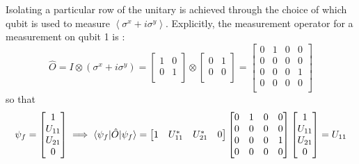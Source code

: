 \documentclass{article}
\begin{document}
    Isolating a particular row of the unitary is achieved through the choice of which qubit is used to measure $\left< \sigma^{x} + i\sigma^{y} \right>$.
    Explicitly, the measurement operator for a measurement on qubit 1 is :
    \begin{equation}
        \hat{O}=I \otimes (\sigma^{x} + i\sigma^{y}) =
        \begin{bmatrix}
            1 & 0\\
            0 & 1\\
        \end{bmatrix}
        \otimes
        \begin{bmatrix}
            0 & 1\\
            0 & 0\\
        \end{bmatrix}=
        \begin{bmatrix}
            0 & 1 & 0 & 0\\
            0 & 0 & 0 & 0\\
            0 & 0 & 0 & 1\\
            0 & 0 & 0 & 0\\
        \end{bmatrix}
    \end{equation}
    so that
    \begin{equation}
        \psi_{f}=
        \begin{bmatrix}
            1 \\
            U_{11} \\
            U_{21} \\
            0 \\
        \end{bmatrix}
        \implies
        \braket{\psi_{f}|\hat{O}|\psi_{f}} =
        \begin{bmatrix}
            1 & U_{11}^{*} & U_{21}^{*} & 0
        \end{bmatrix}
        \begin{bmatrix}
            0 & 1 & 0 & 0\\
            0 & 0 & 0 & 0\\
            0 & 0 & 0 & 1\\
            0 & 0 & 0 & 0\\
        \end{bmatrix}
        \begin{bmatrix}
            1 \\
            U_{11} \\
            U_{21} \\
            0 \\
        \end{bmatrix}
        = U_{11}
    \end{equation}
\end{document}
